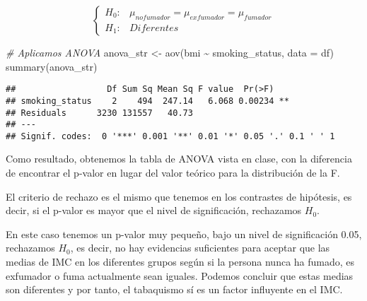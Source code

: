 \documentclass[
]{article}
\newenvironment{Shaded}{\begin{snugshade}}{\end{snugshade}}
\newcommand{\AttributeTok}[1]{\textcolor[rgb]{0.77,0.63,0.00}{#1}}
\newcommand{\CommentTok}[1]{\textcolor[rgb]{0.56,0.35,0.01}{\textit{#1}}}
\newcommand{\FunctionTok}[1]{\textcolor[rgb]{0.00,0.00,0.00}{#1}}
\newcommand{\NormalTok}[1]{#1}
\newcommand{\OtherTok}[1]{\textcolor[rgb]{0.56,0.35,0.01}{#1}}
\newcommand{\SpecialCharTok}[1]{\textcolor[rgb]{0.00,0.00,0.00}{#1}}
\begin{document}
\[ \left\{ \begin{array}{lc}
             H_{0}: & \mu_{no fumador} = \mu_{exfumador} = \mu_{fumador}\\
             H_{1}: & Diferentes
             \end{array}
\right. \]

\begin{Shaded}
\begin{Highlighting}[]
\CommentTok{\# Aplicamos ANOVA}
\NormalTok{anova\_str }\OtherTok{\textless{}{-}} \FunctionTok{aov}\NormalTok{(bmi }\SpecialCharTok{\textasciitilde{}}\NormalTok{ smoking\_status, }\AttributeTok{data =}\NormalTok{ df)}
\FunctionTok{summary}\NormalTok{(anova\_str)}
\end{Highlighting}
\end{Shaded}

\begin{verbatim}
##                  Df Sum Sq Mean Sq F value  Pr(>F)   
## smoking_status    2    494  247.14   6.068 0.00234 **
## Residuals      3230 131557   40.73                   
## ---
## Signif. codes:  0 '***' 0.001 '**' 0.01 '*' 0.05 '.' 0.1 ' ' 1
\end{verbatim}

Como resultado, obtenemos la tabla de ANOVA vista en clase, con la
diferencia de encontrar el p-valor en lugar del valor teórico para la
distribución de la F.

El criterio de rechazo es el mismo que tenemos en los contrastes de
hipótesis, es decir, si el p-valor es mayor que el nivel de
significación, rechazamos \(H_{0}\).

En este caso tenemos un p-valor muy pequeño, bajo un nivel de
significación 0.05, rechazamos \(H_{0}\), es decir, no hay evidencias
suficientes para aceptar que las medias de IMC en los diferentes grupos
según si la persona nunca ha fumado, es exfumador o fuma actualmente
sean iguales. Podemos concluir que estas medias son diferentes y por
tanto, el tabaquismo sí es un factor influyente en el IMC.
\end{document}
